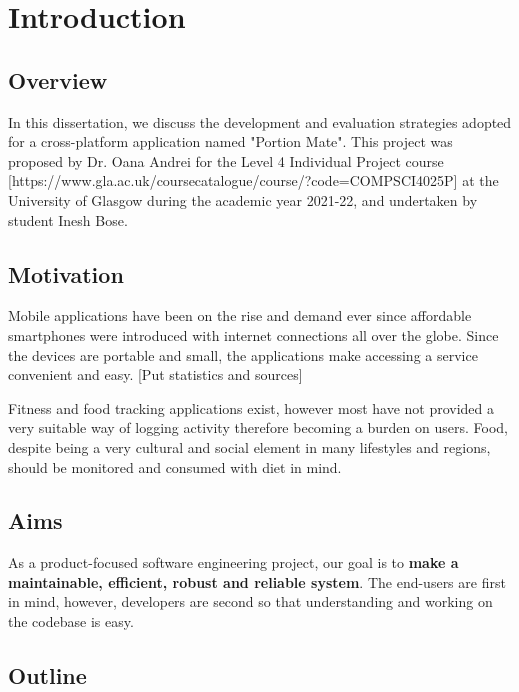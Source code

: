 \documentclass{l4proj}
\begin{document}

\chapter{Introduction}


\section{Overview}

In this dissertation, we discuss the development and evaluation strategies adopted for a cross-platform application named "Portion Mate". This project was proposed by Dr. Oana Andrei for the Level 4 Individual Project course [https://www.gla.ac.uk/coursecatalogue/course/?code=COMPSCI4025P] at the University of Glasgow during the academic year 2021-22, and undertaken by student Inesh Bose.

\section{Motivation}

Mobile applications have been on the rise and demand ever since affordable smartphones were introduced with internet connections all over the globe. Since the devices are portable and small, the applications make accessing a service convenient and easy. [Put statistics and sources]

Fitness and food tracking applications exist, however most have not provided a very suitable way of logging activity therefore becoming a burden on users. Food, despite being a very cultural and social element in many lifestyles and regions, should be monitored and consumed with diet in mind.

\section{Aims}

As a product-focused software engineering project, our goal is to \textbf{make a maintainable, efficient, robust and reliable system}. The end-users are first in mind, however, developers are second so that understanding and working on the codebase is easy.

\section{Outline}
\end{document}
